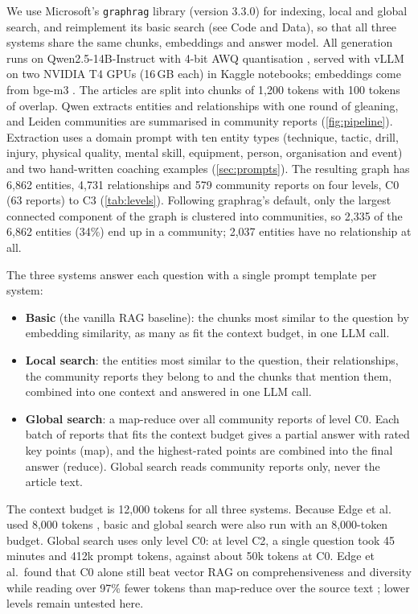 \documentclass{article}
\begin{document}
We use Microsoft's \texttt{graphrag} library (version 3.3.0) for indexing, local and global search, and
reimplement its basic search (see Code and Data), so that all three systems share the same chunks, embeddings
and answer model. All generation runs on
Qwen2.5-14B-Instruct with 4-bit AWQ quantisation \cite{qwen2025}, served with vLLM
\cite{kwon2023vllm} on two NVIDIA T4 GPUs (16\,GB each) in Kaggle notebooks; embeddings come from
bge-m3 \cite{chen2024bgem3}. The articles are split into chunks of 1,200 tokens with 100 tokens of
overlap. Qwen extracts entities and relationships with one round of gleaning, and Leiden
communities are summarised in community reports (\cref{fig:pipeline}). Extraction uses a domain prompt with ten entity types (technique, tactic, drill, injury,
physical quality, mental skill, equipment, person, organisation and event) and two hand-written
coaching examples (\cref{sec:prompts}). The resulting graph has 6,862 entities, 4,731 relationships and 579
community reports on four levels, C0 (63 reports) to C3 (\cref{tab:levels}). Following graphrag's
default, only the largest connected component of the graph is clustered into communities, so 2,335 of
the 6,862 entities (34\%) end up in a community; 2,037 entities have no relationship at all.

The three systems answer each question with a single prompt template per system:
\begin{itemize}
\item \textbf{Basic} (the vanilla RAG baseline): the chunks most similar to the question by embedding
similarity, as many as fit the context budget, in one LLM call.
\item \textbf{Local search}: the entities most similar to the question, their relationships, the
community reports they belong to and the chunks that mention them, combined into one context and
answered in one LLM call.
\item \textbf{Global search}: a map-reduce over all community reports of level C0. Each batch of
reports that fits the context budget gives a partial answer with rated key points (map), and the
highest-rated points are combined into the final answer (reduce). Global search reads community
reports only, never the article text.
\end{itemize}
The context budget is 12,000 tokens for all three systems. Because Edge et al. used 8,000 tokens
\cite{edge2024local}, basic and global search were also run with an 8,000-token budget. Global search
uses only level C0: at level C2, a single question took 45 minutes and 412k prompt tokens, against
about 50k tokens at C0. Edge et al.\ found that C0 alone still beat vector RAG on
comprehensiveness and diversity while reading over 97\% fewer tokens than map-reduce over the source
text \cite{edge2024local}; lower levels remain untested here.
\end{document}
